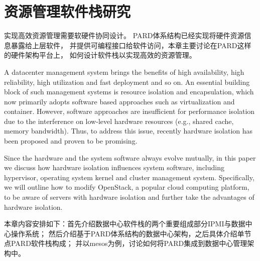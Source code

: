 

\chapter{资源管理软件栈研究}
\label{chap:prm}

实现高效资源管理需要软硬件协同设计。
PARD体系结构已经实现将硬件资源信息暴露给上层软件，
并提供可编程接口给软件访问，本章主要讨论在PARD这样的硬件架构平台上，
如何设计软件栈以实现高效的资源管理。

A datacenter management system brings the benefits of high availability, high
reliability, high utilization and fast deployment and so on.
An essential building block of such management systems is resource isolation and
encapsulation, which now primarily adopts software based approaches such as
virtualization and container. However, software approaches are insufficient
for performance isolation due to the interference on low-level hardware resources
(e.g., shared cache, memory bandwidth). Thus, to address this issue,
recently hardware isolation has been proposed and proven to be promising.

Since the hardware and the system software always evolve mutually, in this paper
we discuss how hardware isolation influences system software, including
hypervisor, operating system kernel and cluster management system.
Specifically, we will outline how to modify OpenStack, a popular
cloud computing platform, to be aware of servers with hardware isolation
and further take the advantages of hardware isolation.

本章内容安排如下：首先介绍数据中心软件栈的两个重要组成部分IPMI与数据中心操作系统；
然后介绍基于PARD体系结构的数据中心架构，之后具体介绍单节点PARD软件栈构成；
并以mesos为例，讨论如何将PARD集成到数据中心管理架构中。

%

